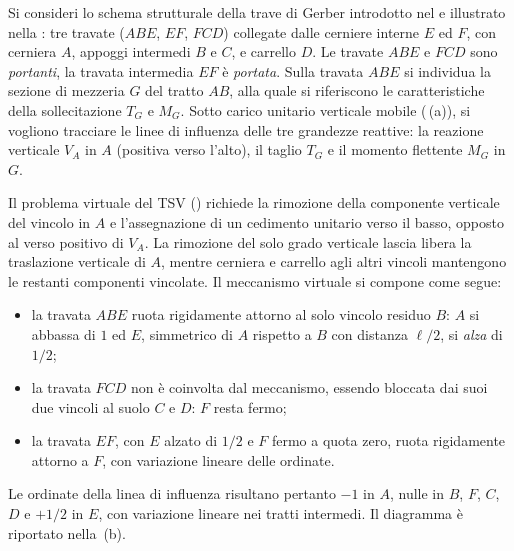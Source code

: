 \begin{esempio}
	\label{subsec:LI_gerber}
	
	Si consideri lo schema strutturale della trave di
	Gerber introdotto nel 
	e illustrato nella
	: tre travate
	($ABE$, $EF$, $FCD$) collegate dalle cerniere interne
	$E$ ed $F$, con cerniera $A$, appoggi intermedi $B$ e
	$C$, e carrello $D$. Le travate $ABE$ e $FCD$ sono
	\emph{portanti}, la travata intermedia $EF$ è
	\emph{portata}. Sulla travata $ABE$ si individua la
	sezione di mezzeria $G$ del tratto $AB$, alla quale si
	riferiscono le caratteristiche della sollecitazione
	$T_G$ e $M_G$. Sotto carico unitario verticale mobile
	(\,(a)), si vogliono tracciare
	le linee di influenza delle tre grandezze reattive: 
	la reazione verticale $V_A$ in $A$ (positiva verso
	l'alto), il taglio $T_G$ e il momento flettente $M_G$
	in $G$.
	
	\begin{svolgimento}
		
		Il problema virtuale del TSV ()
		richiede la rimozione della componente verticale del
		vincolo in $A$ e l'assegnazione di un cedimento
		unitario verso il basso, opposto al verso positivo di
		$V_A$. La rimozione del solo grado verticale lascia libera la
		traslazione verticale di $A$, mentre cerniera e carrello
		agli altri vincoli mantengono le restanti componenti
		vincolate. Il meccanismo virtuale si compone come segue:
		\begin{itemize}[noitemsep]
			\item la travata $ABE$ ruota rigidamente attorno al
			solo vincolo residuo $B$: $A$ si abbassa di $1$ ed
			$E$, simmetrico di $A$ rispetto a $B$ con distanza
			$\ell/2$, si \emph{alza} di $1/2$;
			\item la travata $FCD$ non è coinvolta dal
			meccanismo, essendo bloccata dai suoi due vincoli
			al suolo $C$ e $D$: $F$ resta fermo;
			\item la travata $EF$, con $E$ alzato di $1/2$ e
			$F$ fermo a quota zero, ruota rigidamente attorno
			a $F$, con variazione lineare delle ordinate.
		\end{itemize}
		Le ordinate della linea di influenza risultano
		pertanto $-1$ in $A$, nulle in $B$, $F$, $C$, $D$ e
		$+1/2$ in $E$, con variazione lineare nei tratti
		intermedi. Il diagramma è riportato nella
		\,(b).
		

\end{svolgimento}
\end{esempio}

